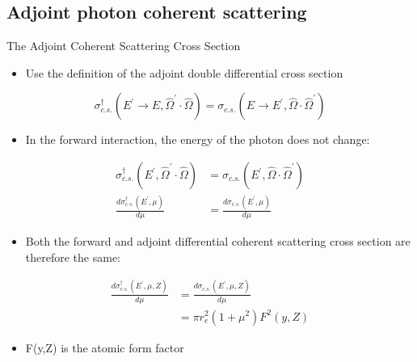 \documentclass{beamer}
\begin{document}
\subsection{Adjoint photon coherent scattering}
\begin{frame}{The Adjoint Coherent Scattering Cross Section}

  \begin{itemize}
    \item Use the definition of the adjoint double differential cross section
  \end{itemize}
  
  \begin{equation*}
    \sigma_{c.s.}^{\dagger}(E^{'} \to E, \hat{\Omega}^{'} \cdot \hat{\Omega}) =
    \sigma_{c.s.}(E \to E^{'},\hat{\Omega} \cdot \hat{\Omega}^{'})
  \end{equation*}
  
  \bigskip

  \begin{itemize}
  \item In the forward interaction, the energy of the photon does not change: 
  \end{itemize}
  \begin{align}
    \sigma_{c.s.}^{\dagger}(E^{'}, \hat{\Omega}^{'} \cdot \hat{\Omega}) & = 
    \sigma_{c.s.}(E^{'},\hat{\Omega} \cdot \hat{\Omega}^{'}) \nonumber \\
    \frac{d\sigma_{c.s.}^{\dagger}(E^{'}, \mu)}{d\mu} & = 
    \frac{d\sigma_{c.s.}(E^{'}, \mu)}{d\mu} \nonumber
  \end{align}

  \medskip

  \begin{itemize}
    \item Both the forward and adjoint differential coherent scattering cross
      section are therefore the same:
  \end{itemize}
  \begin{align}
    \frac{d\sigma_{c.s.}^{\dagger}(E^{'},\mu,Z)}{d\mu} & = 
    \frac{d\sigma_{c.s.}(E^{'},\mu,Z)}{d\mu} \nonumber \\
    & = \pi r_e^2 (1 + \mu^2)F^2(y,Z) \nonumber
  \end{align}

  \begin{itemize}
    \item F(y,Z) is the atomic form factor
  \end{itemize}

\end{frame}
\end{document}
